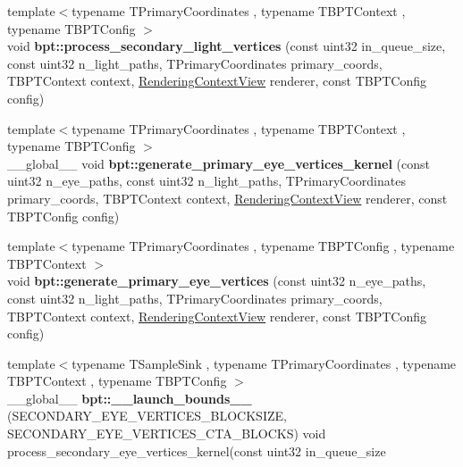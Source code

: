\begin{DoxyCompactItemize}
{\footnotesize template$<$typename T\+Primary\+Coordinates , typename T\+B\+P\+T\+Context , typename T\+B\+P\+T\+Config $>$ }\\void {\bfseries bpt\+::process\+\_\+secondary\+\_\+light\+\_\+vertices} (const uint32 in\+\_\+queue\+\_\+size, const uint32 n\+\_\+light\+\_\+paths, T\+Primary\+Coordinates primary\+\_\+coords, T\+B\+P\+T\+Context context, \hyperlink{struct_rendering_context_view}{Rendering\+Context\+View} renderer, const T\+B\+P\+T\+Config config)
\item 
\mbox{\label{group___b_p_t_lib_ga4c020a309b7b89ec0752ffe6f9df1d3f}} 
{\footnotesize template$<$typename T\+Primary\+Coordinates , typename T\+B\+P\+T\+Context , typename T\+B\+P\+T\+Config $>$ }\\\+\_\+\+\_\+global\+\_\+\+\_\+ void {\bfseries bpt\+::generate\+\_\+primary\+\_\+eye\+\_\+vertices\+\_\+kernel} (const uint32 n\+\_\+eye\+\_\+paths, const uint32 n\+\_\+light\+\_\+paths, T\+Primary\+Coordinates primary\+\_\+coords, T\+B\+P\+T\+Context context, \hyperlink{struct_rendering_context_view}{Rendering\+Context\+View} renderer, const T\+B\+P\+T\+Config config)
\item 
\mbox{\label{group___b_p_t_lib_ga017a29e7b25bcd8fd7e1163ac5979be4}} 
{\footnotesize template$<$typename T\+Primary\+Coordinates , typename T\+B\+P\+T\+Config , typename T\+B\+P\+T\+Context $>$ }\\void {\bfseries bpt\+::generate\+\_\+primary\+\_\+eye\+\_\+vertices} (const uint32 n\+\_\+eye\+\_\+paths, const uint32 n\+\_\+light\+\_\+paths, T\+Primary\+Coordinates primary\+\_\+coords, T\+B\+P\+T\+Context context, \hyperlink{struct_rendering_context_view}{Rendering\+Context\+View} renderer, const T\+B\+P\+T\+Config config)
\item 
\mbox{\label{group___b_p_t_lib_ga39d8463562e9005f247179d9dfffa4c1}} 
{\footnotesize template$<$typename T\+Sample\+Sink , typename T\+Primary\+Coordinates , typename T\+B\+P\+T\+Context , typename T\+B\+P\+T\+Config $>$ }\\\+\_\+\+\_\+global\+\_\+\+\_\+ {\bfseries bpt\+::\+\_\+\+\_\+launch\+\_\+bounds\+\_\+\+\_\+} (S\+E\+C\+O\+N\+D\+A\+R\+Y\+\_\+\+E\+Y\+E\+\_\+\+V\+E\+R\+T\+I\+C\+E\+S\+\_\+\+B\+L\+O\+C\+K\+S\+I\+ZE, S\+E\+C\+O\+N\+D\+A\+R\+Y\+\_\+\+E\+Y\+E\+\_\+\+V\+E\+R\+T\+I\+C\+E\+S\+\_\+\+C\+T\+A\+\_\+\+B\+L\+O\+C\+KS) void process\+\_\+secondary\+\_\+eye\+\_\+vertices\+\_\+kernel(const uint32 in\+\_\+queue\+\_\+size

\end{DoxyCompactItemize}
